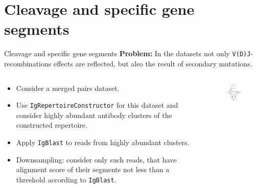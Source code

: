 \documentclass{beamer}\usepackage[]{graphicx}\usepackage[]{color}
\begin{document}
\section{Cleavage and specific gene segments}
\begin{frame}{Cleavage and specific gene segments}
  \textbf{Problem:} In the datasets not only \texttt{V(D)J}-recombinations effects are reflected, but also the result of secondary mutations.
 
  \pause
  \bigskip 
  \small{
  \begin{columns}[T]
    \begin{column}{0.6\textwidth}
      \begin{itemize}
        \item Consider a merged pairs dataset.
        \item Use \texttt{IgRepertoireConstructor} for this dataset and consider {\color{blue} highly abundant antibody clusters} of the constructed repertoire.
        \item Apply \texttt{IgBlast} to reads from highly abundant clusters.
        \item {\color{blue} Downsampling}: consider only such reads, that have alignment score of their segments not less than a {\color{blue} threshold} according to \texttt{IgBlast}.
      \end{itemize}
    \end{column}
    \begin{column}{0.5\textwidth}
      \begin{figure}[h]
        \includegraphics[width=120pt]{Pictures/downsampling.pdf}
      \end{figure}
    \end{column}
  \end{columns}
  }
\end{frame}
\end{document}
